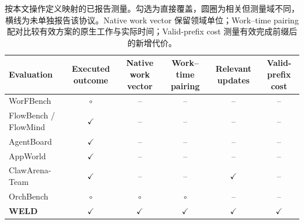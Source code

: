 \begin{table}[t]
\centering\small
\setlength{\tabcolsep}{3pt}
\begin{tabular}{lccccc}
\toprule
Evaluation & Executed outcome & Native work vector & Work--time pairing & Relevant updates & Valid-prefix cost\\
\midrule
WorFBench & $\circ$ & -- & -- & -- & --\\
FlowBench / FlowMind & $\checkmark$ & -- & -- & -- & --\\
AgentBoard & $\checkmark$ & -- & -- & -- & --\\
AppWorld & $\checkmark$ & -- & -- & -- & --\\
ClawArena-Team & $\checkmark$ & -- & -- & $\checkmark$ & --\\
OrchBench & $\circ$ & $\circ$ & $\circ$ & -- & --\\
\textbf{WELD} & $\checkmark$ & $\checkmark$ & $\checkmark$ & $\checkmark$ & $\checkmark$\\
\bottomrule
\end{tabular}
\caption{按本文操作定义映射的已报告测量。勾选为直接覆盖，圆圈为相关但测量域不同，横线为未单独报告该协议。Native work vector 保留领域单位；Work--time pairing 配对比较有效方案的原生工作与实际时间；Valid-prefix cost 测量有效完成前缀后的新增代价。}
\label{tab:zh_coverage}
\end{table}
